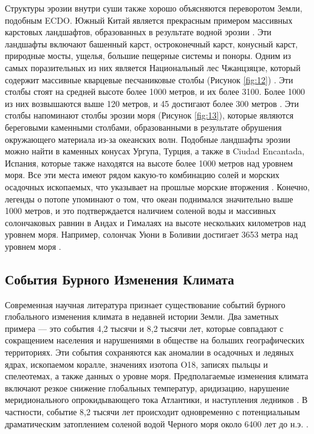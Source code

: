 \documentclass[10pt,twocolumn,letterpaper]{article}
\begin{document}
Структуры эрозии внутри суши также хорошо объясняются переворотом Земли, подобным ECDO. Южный Китай является прекрасным примером массивных карстовых ландшафтов, образованных в результате водной эрозии \cite{82}. Эти ландшафты включают башенный карст, остроконечный карст, конусный карст, природные мосты, ущелья, большие пещерные системы и поноры. Одним из самых поразительных из них является Национальный лес Чжанцзяцзе, который содержит массивные кварцевые песчаниковые столбы (Рисунок \ref{fig:12}) \cite{84}. Эти столбы стоят на средней высоте более 1000 метров, и их более 3100. Более 1000 из них возвышаются выше 120 метров, и 45 достигают более 300 метров \cite{85}. Эти столбы напоминают столбы эрозии моря (Рисунок \ref{fig:13}), которые являются береговыми каменными столбами, образованными в результате обрушения окружающего материала из-за океанских волн. Подобные ландшафты эрозии можно найти в каменных конусах Ургупа, Турция, а также в Ciudad Encantada, Испания, которые также находятся на высоте более 1000 метров над уровнем моря. Все эти места имеют рядом какую-то комбинацию солей и морских осадочных ископаемых, что указывает на прошлые морские вторжения \cite{15,86,87}. Конечно, легенды о потопе \cite{3} упоминают о том, что океан поднимался значительно выше 1000 метров, и это подтверждается наличием соленой воды и массивных солончаковых равнин в Андах и Гималаях на высоте нескольких километров над уровнем моря. Например, солончак Уюни в Боливии достигает 3653 метра над уровнем моря \cite{94}.

\subsection{События Бурного Изменения Климата}

Современная научная литература признает существование событий бурного глобального изменения климата в недавней истории Земли. Два заметных примера — это события 4,2 тысячи и 8,2 тысячи лет, которые совпадают с сокращением населения и нарушениями в обществе на больших географических территориях. Эти события сохраняются как аномалии в осадочных и ледяных ядрах, ископаемом коралле, значениях изотопа O18, записях пыльцы и спелеотемах, а также данных о уровне моря. Предполагаемые изменения климата включают резкое снижение глобальных температур, аридизацию, нарушение меридионального опрокидывающего тока Атлантики, и наступления ледников \cite{90,91,92}. В частности, событие 8,2 тысячи лет происходит одновременно с потенциальным драматическим затоплением соленой водой Черного моря около 6400 лет до н.э. \cite{93}.
\end{document}
